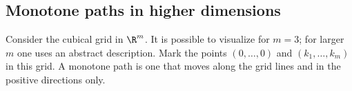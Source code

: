 

\setcounter{section}{4}
\setcounter{subsection}{3}
\setcounter{dfn}{2}

\subsection{Monotone paths in higher dimensions}
Consider the cubical grid in $\R^m$.
It is possible to visualize for $m=3$; for larger $m$ one uses an abstract description.
Mark the points $(0, \ldots, 0)$ and $(k_1, \ldots, k_m)$ in this grid.
A monotone path is one that moves along the grid lines and in the positive directions only.


